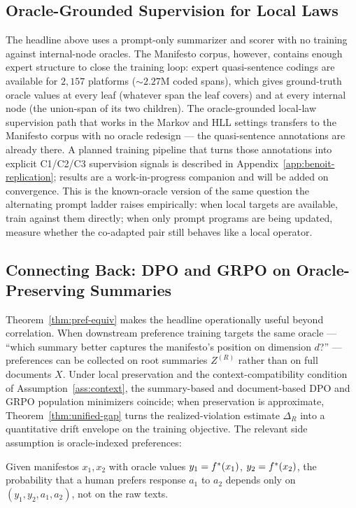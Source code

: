\subsection{Oracle-Grounded Supervision for Local Laws}\label{sec:rile-oracle}

The headline above uses a prompt-only summarizer and scorer with no
training against internal-node oracles. The Manifesto corpus, however,
contains enough expert structure to close the training loop: expert
quasi-sentence codings are available for $2{,}157$ platforms
($\sim\!2.27$M coded spans), which gives ground-truth oracle values at
every leaf (whatever span the leaf covers) and at every internal node
(the union-span of its two children). The oracle-grounded local-law
supervision path that works in the Markov and HLL settings transfers
to the Manifesto corpus with no oracle redesign --- the quasi-sentence
annotations are already there. A planned training pipeline that turns
those annotations into explicit C1/C2/C3 supervision signals is
described in Appendix~\ref{app:benoit-replication}; results are a
work-in-progress companion and will be added on convergence. This is the
known-oracle version of the same question the alternating prompt ladder
raises empirically: when local targets are available, train against them
directly; when only prompt programs are being updated, measure whether
the co-adapted pair still behaves like a local operator.

\subsection{Connecting Back: DPO and GRPO on Oracle-Preserving Summaries}

Theorem~\ref{thm:pref-equiv} makes the headline operationally useful
beyond correlation. When downstream preference training targets the
same oracle --- ``which summary better captures the manifesto's
position on dimension $d$?'' --- preferences can be collected on root
summaries $Z^{(R)}$ rather than on full documents $X$. Under local
preservation and the context-compatibility condition of
Assumption~\ref{ass:context}, the summary-based and
document-based DPO and GRPO population minimizers coincide; when
preservation is approximate, Theorem~\ref{thm:unified-gap} turns the
realized-violation estimate $\Delta_R$ into a quantitative drift
envelope on the training objective. The relevant side assumption is
oracle-indexed preferences:

\begin{assumption}\label{ass:pref}
Given manifestos $x_1, x_2$ with oracle values
$y_1 = f^\ast(x_1)$, $y_2 = f^\ast(x_2)$, the probability that a human
prefers response $a_1$ to $a_2$ depends only on $(y_1, y_2, a_1, a_2)$,
not on the raw texts.
\end{assumption}

